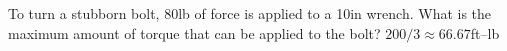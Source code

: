 {To turn a stubborn bolt, 80lb of force is applied to a 10in wrench. What is the maximum amount of torque that can be applied to the bolt?
}
{$200/3\approx 66.67$ft--lb
}

